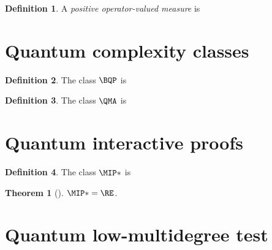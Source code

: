 \documentclass[english,12pt]{reedthesis}
\theoremstyle{plain}
\newtheorem{thm}{Theorem}[section]
\theoremstyle{definition}
\newtheorem{defn}[defn]{Definition}
\theoremstyle{remark}
\begin{document}
\begin{defn}\label{def:povm}
  A \emph{positive operator-valued measure} is
\end{defn}

\section{Quantum complexity classes}

\begin{defn}\label{def:bqp}
  The class $\BQP$ is
\end{defn}

\begin{defn}\label{def:qma}
  The class $\QMA$ is
\end{defn}

\section{Quantum interactive proofs}\label{sec:quant-interactive}

\begin{defn}\label{def:mip-star}
  The class $\MIP*$ is
\end{defn}

\begin{thm}[{\cite{JNVWY21}}]\label{thm:mip-star-is-re}
  $\MIP* = \RE$.
\end{thm}

\section{Quantum low-multidegree test}
\end{document}
